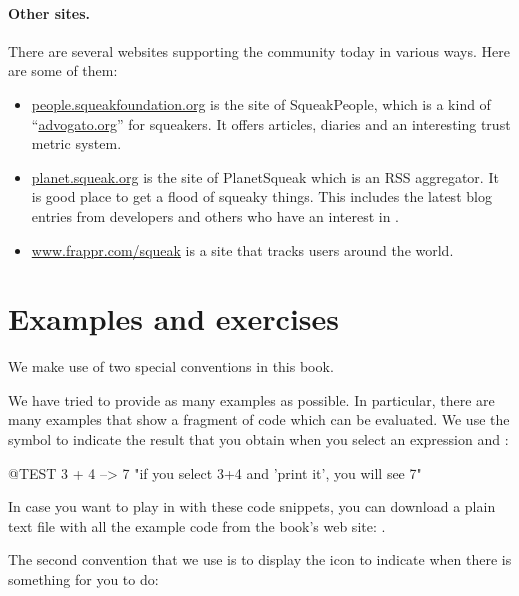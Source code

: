 \documentclass[a4paper,10pt,twoside]{book}
\begin{document}
\paragraph{Other sites.} There are several websites supporting the \sq community today in various ways.
Here are some of them:
\begin{itemize}
  \item \url{people.squeakfoundation.org} is the site of SqueakPeople, which is a kind of ``\url{advogato.org}'' for squeakers. It offers articles, diaries and an interesting trust metric system.

  \item \url{planet.squeak.org} is the site of PlanetSqueak which is an RSS aggregator. It is good place to get a flood of squeaky things. This includes the latest blog entries from developers and others who have an interest in \sq.

  \item \url{www.frappr.com/squeak} is a site that tracks \sq users around the world.

\end{itemize}

\section*{Examples and exercises}

We make use of two special conventions in this book.

We have tried to provide as many examples as possible.
In particular, there are many examples that show a fragment of code which can be evaluated.  We use the symbol \ct{-->} to indicate the result that you obtain when you select an expression and :

\begin{code}{@TEST}
3 + 4 --> 7    "if you select 3+4 and 'print it', you will see 7"
\end{code}

In case you want to play in \sq with these code snippets, you can download a plain text file with all the example code from the book's web site: \sbe.

The second convention that we use is to display the icon \dothisicon{} to indicate when there is something for you to do:


\end{document}
